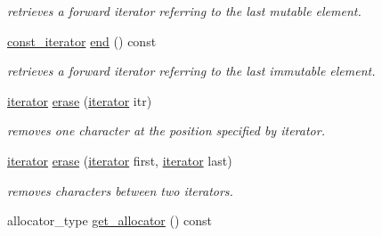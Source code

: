 \begin{DoxyCompactItemize}
\begin{DoxyCompactList}\small\item\em retrieves a forward iterator referring to the last mutable element. \end{DoxyCompactList}\item 
\hypertarget{classhryky_1_1_string_aeb43f91d3bb9badde257256d7c84e155}{\hyperlink{classhryky_1_1iterator_1_1random_1_1_immutable}{const\-\_\-iterator} \hyperlink{classhryky_1_1_string_aeb43f91d3bb9badde257256d7c84e155}{end} () const }\label{classhryky_1_1_string_aeb43f91d3bb9badde257256d7c84e155}

\begin{DoxyCompactList}\small\item\em retrieves a forward iterator referring to the last immutable element. \end{DoxyCompactList}\item 
\hypertarget{classhryky_1_1_string_ab45f3fadb1ffe1fc9fdd1de9e3c87df9}{\hyperlink{classhryky_1_1iterator_1_1random_1_1_mutable}{iterator} \hyperlink{classhryky_1_1_string_ab45f3fadb1ffe1fc9fdd1de9e3c87df9}{erase} (\hyperlink{classhryky_1_1iterator_1_1random_1_1_mutable}{iterator} itr)}\label{classhryky_1_1_string_ab45f3fadb1ffe1fc9fdd1de9e3c87df9}

\begin{DoxyCompactList}\small\item\em removes one character at the position specified by iterator. \end{DoxyCompactList}\item 
\hypertarget{classhryky_1_1_string_a1bfe86dd9a32315aeecdbd8f7f198be0}{\hyperlink{classhryky_1_1iterator_1_1random_1_1_mutable}{iterator} \hyperlink{classhryky_1_1_string_a1bfe86dd9a32315aeecdbd8f7f198be0}{erase} (\hyperlink{classhryky_1_1iterator_1_1random_1_1_mutable}{iterator} first, \hyperlink{classhryky_1_1iterator_1_1random_1_1_mutable}{iterator} last)}\label{classhryky_1_1_string_a1bfe86dd9a32315aeecdbd8f7f198be0}

\begin{DoxyCompactList}\small\item\em removes characters between two iterators. \end{DoxyCompactList}\item 
\hypertarget{classhryky_1_1_string_a710ee15ff97ece02e764e0be568522bc}{allocator\-\_\-type \hyperlink{classhryky_1_1_string_a710ee15ff97ece02e764e0be568522bc}{get\-\_\-allocator} () const }\label{classhryky_1_1_string_a710ee15ff97ece02e764e0be568522bc}


\end{DoxyCompactItemize}
